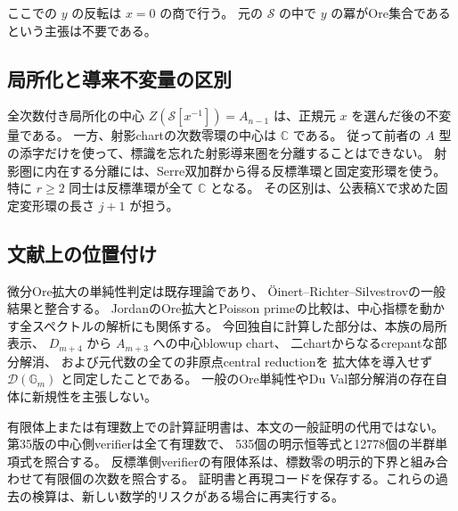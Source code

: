 ここでの $y$ の反転は $x=0$ の商で行う。
元の $\mathcal S$ の中で $y$ の冪がOre集合であるという主張は不要である。

\subsection{局所化と導来不変量の区別}

全次数付き局所化の中心
$Z(\mathcal S[x^{-1}])=A_{n-1}$ は、正規元 $x$ を選んだ後の不変量である。
一方、射影chartの次数零環の中心は $\mathbb C$ である。
従って前者の $A$ 型の添字だけを使って、標識を忘れた射影導来圏を分離することはできない。
射影圏に内在する分離には、Serre双加群から得る反標準環と固定変形環を使う。
特に $r\ge2$ 同士は反標準環が全て $\mathbb C$ となる。
その区別は、公表稿Xで求めた固定変形環の長さ $j+1$ が担う。

\subsection{文献上の位置付け}

微分Ore拡大の単純性判定は既存理論であり、
\"Oinert--Richter--Silvestrovの一般結果と整合する。
JordanのOre拡大とPoisson primeの比較は、中心指標を動かす全スペクトルの解析にも関係する。
今回独自に計算した部分は、本族の局所表示、
$D_{m+4}$ から $A_{m+3}$ への中心blowup chart、
二chartからなるcrepantな部分解消、
および元代数の全ての非原点central reductionを
拡大体を導入せず $\mathcal D(\mathbb G_m)$ と同定したことである。
一般のOre単純性やDu Val部分解消の存在自体に新規性を主張しない。

有限体上または有理数上での計算証明書は、本文の一般証明の代用ではない。
第35版の中心側verifierは全て有理数で、
535個の明示恒等式と12778個の半群単項式を照合する。
反標準側verifierの有限体系は、標数零の明示的下界と組み合わせて有限個の次数を照合する。
証明書と再現コードを保存する。これらの過去の検算は、新しい数学的リスクがある場合に再実行する。
